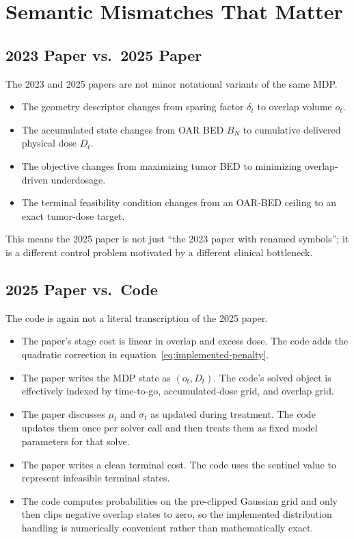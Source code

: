 \documentclass[11pt]{article}
\DeclareRobustCommand{\code}[1]{\ifmmode\text{\texttt{\detokenize{#1}}}\else\texttt{\detokenize{#1}}\fi}
\newcommand{\BN}{B_N}
\begin{document}
\section{Semantic Mismatches That Matter}

\subsection{2023 Paper vs.\ 2025 Paper}

The 2023 and 2025 papers are not minor notational variants of the same MDP.

\begin{itemize}
\item The geometry descriptor changes from sparing factor $\delta_t$ to overlap volume $o_t$.
\item The accumulated state changes from OAR BED $\BN$ to cumulative delivered physical dose $D_t$.
\item The objective changes from maximizing tumor BED to minimizing overlap-driven underdosage.
\item The terminal feasibility condition changes from an OAR-BED ceiling to an exact tumor-dose target.
\end{itemize}

This means the 2025 paper is not just ``the 2023 paper with renamed symbols''; it is a different control problem motivated by a different clinical bottleneck.

\subsection{2025 Paper vs.\ Code}

The code is again not a literal transcription of the 2025 paper.

\begin{itemize}
\item The paper's stage cost is linear in overlap and excess dose. The code adds the quadratic correction in equation~\eqref{eq:implemented-penalty}.
\item The paper writes the MDP state as $(o_t,D_t)$. The code's solved object is effectively indexed by time-to-go, accumulated-dose grid, and overlap grid.
\item The paper discusses $\mu_t$ and $\sigma_t$ as updated during treatment. The code updates them once per solver call and then treats them as fixed model parameters for that solve.
\item The paper writes a clean terminal cost. The code uses the sentinel value \code{-1000000000000} to represent infeasible terminal states.
\item The code computes probabilities on the pre-clipped Gaussian grid and only then clips negative overlap states to zero, so the implemented distribution handling is numerically convenient rather than mathematically exact.
\end{itemize}
\end{document}

